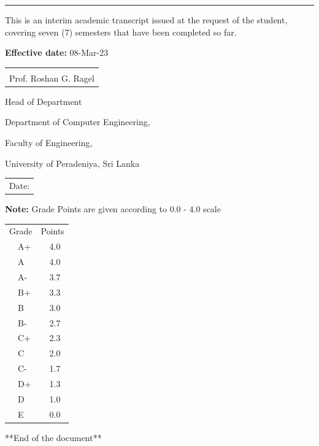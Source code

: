 \documentclass[12pt]{article}
\makeatletter
\newcommand{\sign}[1]{%
  \begin{tabular}[t]{@{}l@{}}
  \makebox[2.5in]{\dotfill}\\
  \strut#1\strut
  \end{tabular}%
}
\newcommand{\Date}{%
  \begin{tabular}[t]{@{}p{2.5in}@{}}
  \\[-2ex]
  \strut Date: \dotfill\strut
  \end{tabular}%
}
\makeatother
\begin{document}
\noindent\rule{\textwidth}{1pt}
\vspace{5pt}
This is an interim academic transcript issued at the request of the student, covering seven (7) semesters that have been completed so far.
\vspace{5pt}

\noindent\textbf{Effective date:} 08-Mar-23

\vspace{45pt}

\noindent
\begin{minipage}[t]{0.5\linewidth}
    \raggedright
    \sign{Prof. Roshan G. Ragel}
    \par
    Head of Department\par
    Department of Computer Engineering, \par
    Faculty of Engineering, \par
    University of Peradeniya, Sri Lanka
\end{minipage}%
\hfill
  \begin{minipage}[t]{0.4\linewidth}
    \Date
  \end{minipage}



\textbf{Note:} Grade Points are given according to 0.0 - 4.0 scale

\begin{table}[H]
\centering
\begin{tabular}{ll}
\multicolumn{1}{c}{Grade} &
\multicolumn{1}{c}{Points}\\
\ \ A+    & \ \ 4.0    \\ 
\ \ A     & \ \ 4.0    \\ 
\ \ A-    & \ \ 3.7    \\ 
\ \ B+    & \ \ 3.3    \\ 
\ \ B    & \ \ 3.0    \\ 
\ \ B-    & \ \ 2.7    \\ 
\ \ C+    & \ \ 2.3    \\ 
\ \ C     & \ \ 2.0    \\ 
\ \ C-    & \ \ 1.7    \\ 
\ \ D+    & \ \ 1.3    \\ 
\ \ D     & \ \ 1.0    \\ 
\ \ E     & \ \ 0.0    \\ 
\end{tabular}
\end{table}

\begin{center}
**End of the document**
\end{center}
\end{document}
